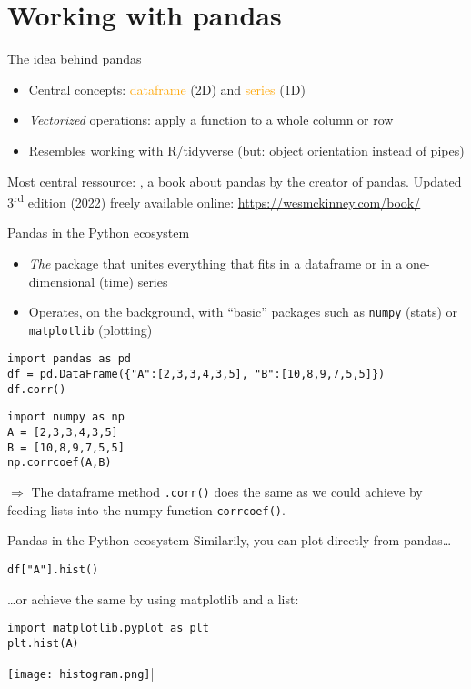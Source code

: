 \section{Working with pandas}

\begin{frame}{The idea behind pandas}
  \begin{itemize}
  \item Central concepts: \textcolor{orange}{dataframe} (2D) and \textcolor{orange}{series} (1D)
  \item \emph{Vectorized} operations: apply a function to a whole column or row
  \item Resembles working with R/tidyverse (but: object orientation instead of pipes)
  \end{itemize}
  \pause
Most central ressource: \textcite{McKinney2012}, a book about pandas by the creator of pandas. Updated 3\textsuperscript{rd} edition (2022) freely available online: \url{https://wesmckinney.com/book/}
\end{frame}


\begin{frame}[fragile]{Pandas in the Python ecosystem}
  \begin{itemize}
  \item \emph{The} package that unites everything that fits in a dataframe or in a one-dimensional (time) series
  \item Operates, on the background, with ``basic'' packages such as \texttt{numpy} (stats) or \texttt{matplotlib} (plotting)
  \end{itemize}

\begin{verbatim}
import pandas as pd
df = pd.DataFrame({"A":[2,3,3,4,3,5], "B":[10,8,9,7,5,5]})
df.corr()
\end{verbatim}
\vspace{-1cm}
\begin{verbatim}
import numpy as np
A = [2,3,3,4,3,5]
B = [10,8,9,7,5,5]
np.corrcoef(A,B)
\end{verbatim}

$\Rightarrow$ The dataframe method \texttt{.corr()} does the same as we could achieve by feeding lists into the numpy function \texttt{corrcoef()}.
\end{frame}




\begin{frame}[fragile]{Pandas in the Python ecosystem}
 Similarily, you can plot directly from pandas\ldots
\begin{verbatim}
df["A"].hist()
\end{verbatim}
\ldots or achieve the same by using matplotlib and a list:
\begin{verbatim}
import matplotlib.pyplot as plt
plt.hist(A)
\end{verbatim}

\centering

\texttt{[image: histogram.png]}\hfill                           |


\end{frame}


